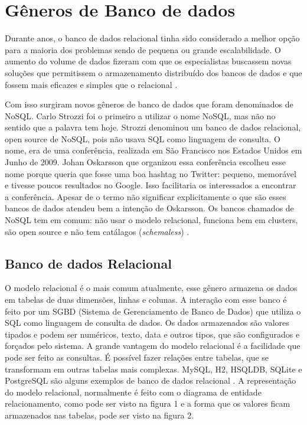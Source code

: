 \section{Gêneros de Banco de dados}
\label{sec:databasetype}
Durante anos, o banco de dados relacional tinha sido considerado a melhor opção para a maioria dos problemas sendo de pequena ou grande escalabilidade. O aumento do volume de dados fizeram com que os especialistas buscassem novas soluções que permitissem o armazenamento distribuído dos bancos de dados e que fossem mais eficazes e simples que o relacional \cite{NoSQL}.

Com isso surgiram novos gêneros de banco de dados que foram denominados de NoSQL. Carlo Strozzi foi o primeiro a utilizar o nome NoSQL, mas não no sentido que a palavra tem hoje. Strozzi denominou um banco de dados relacional, open source de NoSQL, pois não usava SQL como linguagem de consulta. O nome, era de uma conferência, realizada em São Francisco nos Estados Unidos em Junho de 2009. Johan Oskarsson que organizou essa conferência escolheu esse nome porque queria que fosse uma boa hashtag no Twitter: pequeno, memorável e tivesse poucos resultados no Google. Isso facilitaria os interessados a encontrar a conferência. Apesar de o termo não significar explicitamente o que são esses bancos de dados atendeu bem a intenção de Oskarsson. Os bancos chamados de NoSQL tem em comum: não usar o modelo relacional, funciona bem em clusters, são open source e não tem catálagos (\textit{schemaless}) \cite{NoSQL}.


\subsection{Banco de dados Relacional}
\label{subsec:relationaldatabasetype}
O modelo relacional é o mais comum atualmente, esse gênero armazena os dados em tabelas de duas dimensões, linhas e colunas. A interação com esse banco é feito por um SGBD (Sistema de Gerenciamento de Banco de Dados) que utiliza o SQL como linguagem de consulta de dados. Os dados armazenados são valores tipados e podem ser numéricos, texto, data e outros tipos, que são configurados e forçados pelo sistema. A grande vantagem do modelo relacional é a facilidade que pode ser feito as consultas. É possível fazer relações entre tabelas, que se transformam em outras tabelas mais complexas. MySQL, H2, HSQLDB, SQLite e PostgreSQL são alguns exemplos de banco de dados relacional \cite{SDSW}.
A representação do modelo relacional, normalmente é feito com o diagrama de entidade relacionamento, como pode ser visto na figura 1 e a forma que os valores ficam armazenados nas tabelas, pode ser visto na figura 2.

